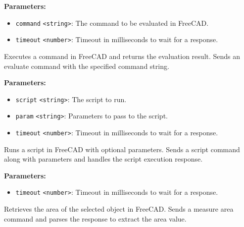 \documentclass[12pt,a4paper]{article}
\begin{document}
\vspace{5mm}
\noindent {}


\noindent \textbf{Parameters:}
\begin{itemize}
  \item \texttt{command} \texttt{<string>}: The command to be evaluated in FreeCAD.
  \item \texttt{timeout} \texttt{<number>}: Timeout in milliseconds to wait for a response.
\end{itemize}

\noindent Executes a command in FreeCAD and returns the evaluation result.
Sends an evaluate command with the specified command string.

\vspace{5mm}
\noindent {}


\noindent \textbf{Parameters:}
\begin{itemize}
  \item \texttt{script} \texttt{<string>}: The script to run.
  \item \texttt{param} \texttt{<string>}: Parameters to pass to the script.
  \item \texttt{timeout} \texttt{<number>}: Timeout in milliseconds to wait for a response.
\end{itemize}

\noindent Runs a script in FreeCAD with optional parameters.
Sends a script command along with parameters and handles the script execution response.

\vspace{5mm}
\noindent {}


\noindent \textbf{Parameters:}
\begin{itemize}
  \item \texttt{timeout} \texttt{<number>}: Timeout in milliseconds to wait for a response.
\end{itemize}

\noindent Retrieves the area of the selected object in FreeCAD.
Sends a measure area command and parses the response to extract the area value.
\end{document}
